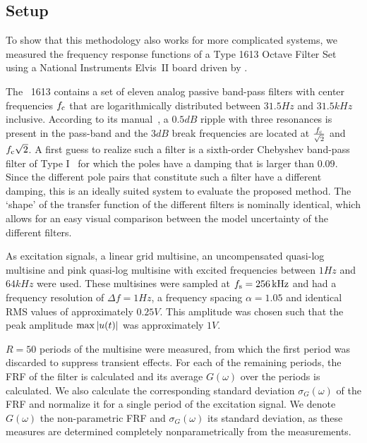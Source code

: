   \subsection{Setup}
    \label{sec:excitation:measurement:setup}
    To show that this methodology also works for more complicated systems, we measured the frequency response functions of a \bruelkjaer Type 1613 Octave Filter Set using a National Instruments Elvis~II board driven by \labview.
    
    The \BK~1613 contains a set of eleven analog passive band-pass filters with center frequencies $f_{\mathrm{c}}$ that are logarithmically distributed between $31.5\unit{Hz}$ and $31.5\unit{kHz}$ inclusive.
    According to its manual~\citep{datasheet_bk1613}, a $0.5\unit{dB}$ ripple with three resonances is present in the pass-band and the $3\unit{dB}$ break frequencies are located at $\frac{f_{\mathrm{c}}}{\sqrt{2}}$ and $f_{\mathrm{c}} \sqrt{2}$.
    A first guess to realize such a filter is a sixth-order Chebyshev band-pass filter of Type I~\citep{Zverev1967} for which the poles have a damping that is larger than $0.09$.
    Since the different pole pairs that constitute such a filter have a different damping, this is an ideally suited system to evaluate the proposed method.
    The `shape' of the transfer function of the different filters is nominally identical, which allows for an easy visual comparison between the model uncertainty of the different filters.

    As excitation signals, a linear grid multisine, an uncompensated quasi-log multisine and pink quasi-log multisine with excited frequencies between $1 \unit{Hz}$ and $64 \unit{kHz}$ were used.
    These multisines were sampled at $f_{\mathrm{s}} = 256\,\mathrm{kHz}$ and had a frequency resolution of $\Delta f = 1 \unit{Hz}$, a frequency spacing $\alpha = 1.05$ and identical \gls{RMS} values of approximately $0.25 \unit{V}$.
    This amplitude was chosen such that the peak amplitude $\max \left| u(t) \right|$ was approximately $1 \unit{V}$.

    $R=50$ periods of the multisine were measured, from which the first period was discarded to suppress transient effects.
    For each of the remaining periods, the \gls{FRF} of the filter is calculated and its average $G\left(\omega \right)$ over the periods is calculated.
    We also calculate the corresponding standard deviation $\sigma_G\left( \omega \right)$ of the \gls{FRF} and normalize it for a single period of the excitation signal.
    We denote $G\left(\omega \right)$ the non-parametric FRF and $\sigma_G\left( \omega \right)$ its standard deviation, as these measures are determined completely nonparametrically from the measurements.


